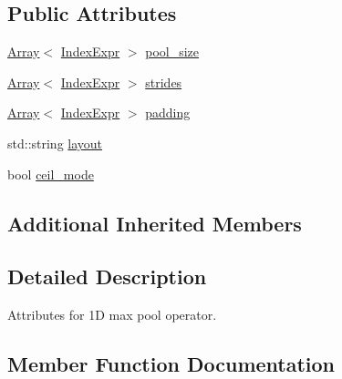 \subsection*{Public Attributes}
\begin{DoxyCompactItemize}
\item 
\hyperlink{classtvm_1_1Array}{Array}$<$ \hyperlink{namespacetvm_1_1relay_ae153a27d81399fd266b8d598227764c4}{Index\+Expr} $>$ \hyperlink{structtvm_1_1relay_1_1MaxPool1DAttrs_af4792b9065cf98ef5335c34e581c05cd}{pool\+\_\+size}
\item 
\hyperlink{classtvm_1_1Array}{Array}$<$ \hyperlink{namespacetvm_1_1relay_ae153a27d81399fd266b8d598227764c4}{Index\+Expr} $>$ \hyperlink{structtvm_1_1relay_1_1MaxPool1DAttrs_a174ab0e449f26b9f7ad10355160e6284}{strides}
\item 
\hyperlink{classtvm_1_1Array}{Array}$<$ \hyperlink{namespacetvm_1_1relay_ae153a27d81399fd266b8d598227764c4}{Index\+Expr} $>$ \hyperlink{structtvm_1_1relay_1_1MaxPool1DAttrs_a3044a18d45840ede7ab245ebdcc19bac}{padding}
\item 
std\+::string \hyperlink{structtvm_1_1relay_1_1MaxPool1DAttrs_a12570c4c200ca5489fa9b902bc140b54}{layout}
\item 
bool \hyperlink{structtvm_1_1relay_1_1MaxPool1DAttrs_a8fec642661f694c685cf85f1b85b1155}{ceil\+\_\+mode}
\end{DoxyCompactItemize}
\subsection*{Additional Inherited Members}


\subsection{Detailed Description}
Attributes for 1D max pool operator. 

\subsection{Member Function Documentation}
